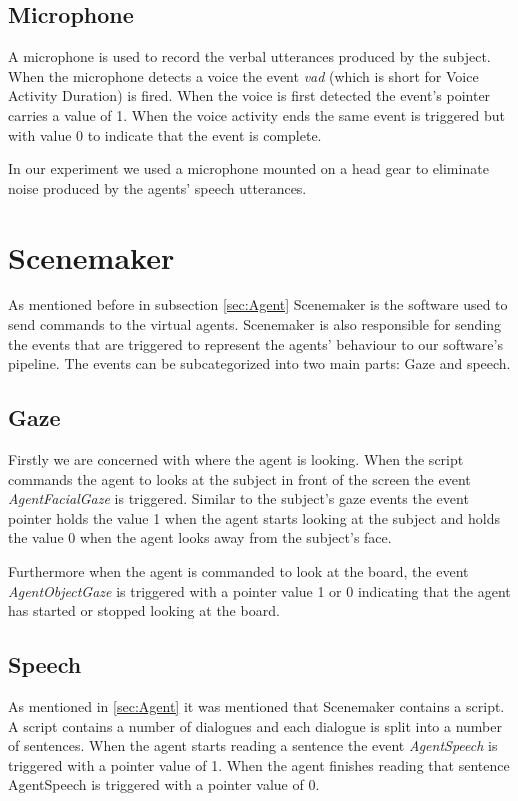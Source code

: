 \documentclass[12pt, a4paper, fleqn]{memoir}%
\begin{document}
\subsection{Microphone}
A microphone is used to record the verbal utterances produced by the subject. When the microphone detects a voice the event \textit{vad} (which is short for Voice Activity Duration) is fired. When the voice is first detected the event's pointer carries a value of 1. When the voice activity ends the same event is triggered but with value 0 to indicate that the event is complete.

In our experiment we used a microphone mounted on a head gear to eliminate noise produced by the agents' speech utterances.

\section{Scenemaker}
\label{sec:Scenemaker}
As mentioned before in subsection \ref{sec:Agent} Scenemaker is the software used to send commands to the virtual agents. Scenemaker is also responsible for sending the events that are triggered to represent the agents' behaviour to our software's pipeline. The events can be subcategorized into two main parts: Gaze and speech.

\subsection{Gaze}
Firstly we are concerned with where the agent is looking. When the script commands the agent to looks at the subject in front of the screen the event \textit{AgentFacialGaze} is triggered. Similar to the subject's gaze events the event pointer holds the value 1 when the agent starts looking at the subject and holds the value 0 when the agent looks away from the subject's face.

Furthermore when the agent is commanded to look at the board, the event \textit{AgentObjectGaze} is triggered with a pointer value 1 or 0 indicating that the agent has started or stopped looking at the board.

\subsection{Speech}
As mentioned in \ref{sec:Agent} it was mentioned that Scenemaker contains a script. A script contains a number of dialogues and each dialogue is split into a number of sentences. When the agent starts reading a sentence the event \textit{AgentSpeech} is triggered with a pointer value of 1. When the agent finishes reading that sentence AgentSpeech is triggered with a pointer value of 0.
\end{document}
